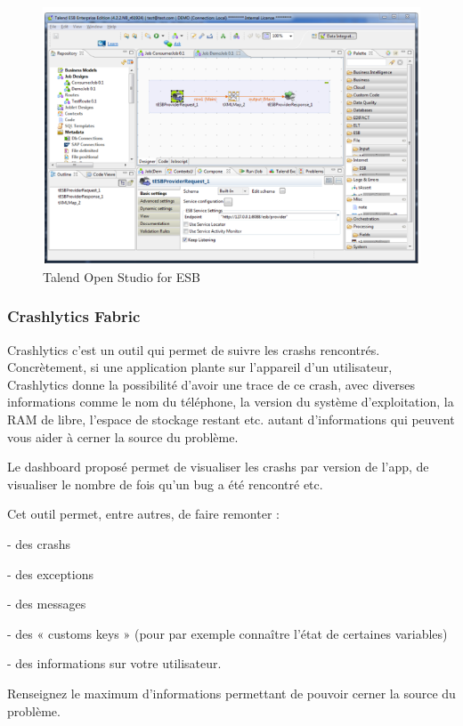 \begin{figure}[H]
\begin{center}
\includegraphics[width=1\linewidth]{images/talend}
\end{center}
\caption{Talend Open Studio for ESB}
\label{fig:7}
\end{figure}

\subsubsection{Crashlytics Fabric}

Crashlytics c’est un outil qui permet de suivre les crashs rencontrés. Concrètement, si une application plante sur l’appareil d’un utilisateur, Crashlytics donne la possibilité d’avoir une trace de ce crash, avec diverses informations comme le nom du téléphone, la version du système d’exploitation, la RAM de libre, l’espace de stockage restant etc. autant d’informations qui peuvent vous aider à cerner la source du problème.

Le dashboard proposé permet de visualiser les crashs par version de l’app, de visualiser le nombre de fois qu’un bug a été rencontré etc.

Cet outil  permet, entre autres, de faire remonter :

- des crashs

- des exceptions

- des messages

- des « customs keys » (pour par exemple connaître l’état de certaines variables)

- des informations sur votre utilisateur.


Renseignez le maximum d’informations permettant de pouvoir cerner la source du problème. \cite{crashlytics} 

